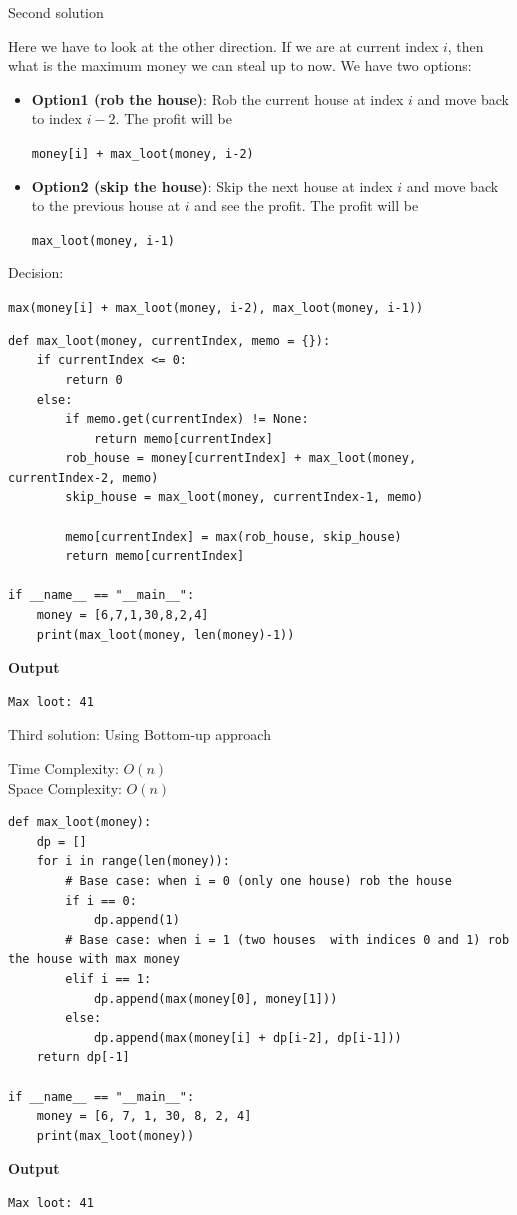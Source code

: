 \documentclass[a4paper,11pt]{book}
\begin{document}
\noindent Second solution

\noindent Here we have to look at the other direction. If we are at current index $i$, then what is the maximum money we can steal up to now. We have two options:

\begin{itemize}
\item \textbf{Option1 (rob the house)}: Rob the current house at index $i$ and move back to index $i-2$. The profit will be \begin{center}
\lstinline{money[i] + max_loot(money, i-2)}
\end{center} 
\item \textbf{Option2 (skip the house)}: Skip the next house at index $i$ and move back to the previous house at $i$ and see the profit. The profit will be \begin{center}
\lstinline{max_loot(money, i-1)}
\end{center}
\end{itemize}

\noindent Decision: \begin{center}
\lstinline{max(money[i] + max_loot(money, i-2), max_loot(money, i-1))}
\end{center}

\begin{lstlisting}
def max_loot(money, currentIndex, memo = {}):
    if currentIndex <= 0:
        return 0
    else:
        if memo.get(currentIndex) != None:
            return memo[currentIndex]
        rob_house = money[currentIndex] + max_loot(money, currentIndex-2, memo)
        skip_house = max_loot(money, currentIndex-1, memo)

        memo[currentIndex] = max(rob_house, skip_house)
        return memo[currentIndex]
        
if __name__ == "__main__":
    money = [6,7,1,30,8,2,4]
    print(max_loot(money, len(money)-1))
\end{lstlisting}
\textbf{Output}
\begin{lstlisting}
Max loot: 41
\end{lstlisting}

\noindent Third solution: Using Bottom-up approach

\noindent Time Complexity: $O(n)$\\
\noindent Space Complexity: $O(n)$

\begin{lstlisting}
def max_loot(money):
    dp = []
    for i in range(len(money)):
        # Base case: when i = 0 (only one house) rob the house
        if i == 0:
            dp.append(1)
        # Base case: when i = 1 (two houses  with indices 0 and 1) rob the house with max money
        elif i == 1:
            dp.append(max(money[0], money[1]))
        else:
            dp.append(max(money[i] + dp[i-2], dp[i-1]))
    return dp[-1]  
 
if __name__ == "__main__":
    money = [6, 7, 1, 30, 8, 2, 4]
    print(max_loot(money))
\end{lstlisting}
\textbf{Output}
\begin{lstlisting}
Max loot: 41
\end{lstlisting}
\end{document}
